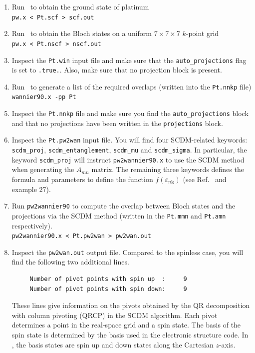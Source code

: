 \documentclass[a4paper,11pt,twoside]{article}
\begin{document}
\begin{enumerate}
    \item Run \pwscf\ to obtain the ground state of platinum\\
    {\tt pw.x < Pt.scf > scf.out}
    
    \item Run \pwscf\ to obtain the Bloch states on a uniform $7\times 7\times 7$ $k$-point
    grid\\ 
    {\tt pw.x < Pt.nscf > nscf.out}

    \item Inspect the {\tt Pt.win} input file and make sure that the {\tt auto\_projections} flag is set to {\tt .true.}. Also, make sure that no projection block is present.
    
    \item Run \wannier\ to generate a list of the required overlaps (written
    into the {\tt Pt.nnkp} file)\\
    {\tt wannier90.x -pp Pt}

    \item Inspect the {\tt Pt.nnkp} file and make sure you find the {\tt auto\_projections} block and that no projections have been written in the {\tt projections} block.

    \item Inspect the {\tt Pt.pw2wan} input file. You will find four SCDM-related keywords: {\tt scdm\_proj}, {\tt scdm\_entanglement}, {\tt scdm\_mu} and {\tt scdm\_sigma}.
    In particular, the keyword {\tt scdm\_proj} will instruct {\tt pw2wannier90.x}  to use the SCDM method when generating the $A_{mn}$ matrix.
    The remaining three keywords defines the formula and parameters to define the function $f(\varepsilon_{n\mathbf{k}})$ (see Ref.~\cite{LinLin-ArXiv2017} and example 27).

    \item Run {\tt pw2wannier90} to compute the overlap between Bloch
    states and the projections via the SCDM method (written in the
    {\tt Pt.mmn} and {\tt Pt.amn} respectively).\\  
    {\tt pw2wannier90.x < Pt.pw2wan > pw2wan.out}

    \item Inspect the {\tt pw2wan.out} output file.
    Compared to the spinless case, you will find the following two additional lines.
    \begin{verbatim}
     Number of pivot points with spin up  :     9
     Number of pivot points with spin down:     9
    \end{verbatim}
    These lines give information on the pivots obtained by the QR decomposition with column pivoting (QRCP) in the SCDM algorithm.     Each pivot determines a point in the real-space grid and a spin state. The basis of the spin state is determined by the basis used in the electronic structure code. In \pwscf, the basis states are spin up and down states along the Cartesian $z$-axis.
    

\end{enumerate}
\end{document}
